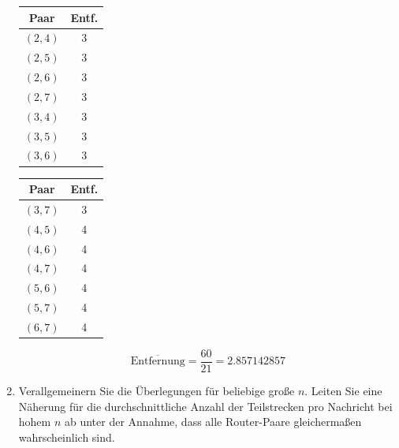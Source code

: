 \begin{enumerate}
\begin{minipage}{0.24\linewidth}
\begin{tabular}{|c|c|}
                \hline
                Paar & Entf. \\
                \hline
                $(2, 4)$    & 3         \\
                \hline
                $(2, 5)$    & 3         \\
                \hline
                $(2, 6)$    & 3         \\
                \hline
                $(2, 7)$    & 3         \\
                \hline
                $(3, 4)$    & 3         \\
                \hline
                $(3, 5)$    & 3         \\
                \hline
                $(3, 6)$    & 3         \\
                \hline
            \end{tabular}
        \end{minipage}
        \begin{minipage}{0.24\linewidth}
            \centering
            \begin{tabular}{|c|c|}
                \hline
                Paar & Entf. \\
                \hline
                $(3, 7)$    & 3         \\
                \hline
                $(4, 5)$    & 4         \\
                \hline
                $(4, 6)$    & 4         \\
                \hline
                $(4, 7)$    & 4         \\
                \hline
                $(5, 6)$    & 4         \\
                \hline
                $(5, 7)$    & 4         \\
                \hline
                $(6, 7)$    & 4         \\
                \hline
            \end{tabular}
        \end{minipage}

        \begin{equation*}
            \overline{\text{Entfernung}} = \dfrac{60}{21} = 2.857142857
        \end{equation*}

    \item Verallgemeinern Sie die Überlegungen für beliebige große $n$. Leiten
        Sie eine Näherung für die durchschnittliche Anzahl der Teilstrecken pro
        Nachricht bei hohem $n$ ab unter der Annahme, dass alle Router-Paare
        gleichermaßen wahrscheinlich sind.


\end{enumerate}
